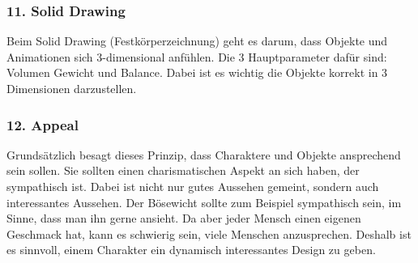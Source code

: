 \subsubsection{11. Solid Drawing}
Beim Solid Drawing (Festkörperzeichnung) geht es darum, dass Objekte und Animationen sich 3-dimensional anfühlen. 
Die 3 Hauptparameter dafür sind: Volumen Gewicht und Balance. Dabei ist es wichtig die Objekte korrekt in 3 Dimensionen darzustellen.  

\subsubsection{12. Appeal}
Grundsätzlich besagt dieses Prinzip, dass Charaktere und Objekte ansprechend sein sollen. Sie sollten einen charismatischen 
Aspekt an sich haben, der sympathisch ist. Dabei ist nicht nur gutes Aussehen gemeint, sondern auch interessantes Aussehen. Der Bösewicht sollte zum Beispiel sympathisch sein, im Sinne, dass man ihn gerne ansieht. 
Da aber jeder Mensch einen eigenen Geschmack hat, kann es schwierig sein, viele Menschen anzusprechen. Deshalb ist es sinnvoll, einem Charakter ein dynamisch interessantes Design zu geben. 
